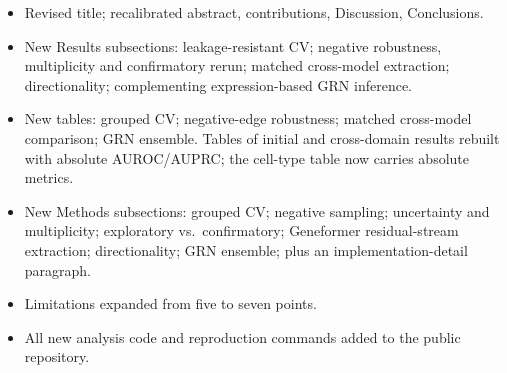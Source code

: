 \documentclass[11pt]{article}
\begin{document}
\begin{itemize}[leftmargin=1.4em,itemsep=2pt]
\item Revised title; recalibrated abstract, contributions, Discussion,
Conclusions.
\item New Results subsections: leakage-resistant CV; negative robustness,
multiplicity and confirmatory rerun; matched cross-model extraction;
directionality; complementing expression-based GRN inference.
\item New tables: grouped CV; negative-edge robustness; matched cross-model
comparison; GRN ensemble. Tables of initial and cross-domain results rebuilt with
absolute AUROC/AUPRC; the cell-type table now carries absolute metrics.
\item New Methods subsections: grouped CV; negative sampling; uncertainty and
multiplicity; exploratory vs.\ confirmatory; Geneformer residual-stream
extraction; directionality; GRN ensemble; plus an implementation-detail
paragraph.
\item Limitations expanded from five to seven points.
\item All new analysis code and reproduction commands added to the public
repository.
\end{itemize}
\end{document}
